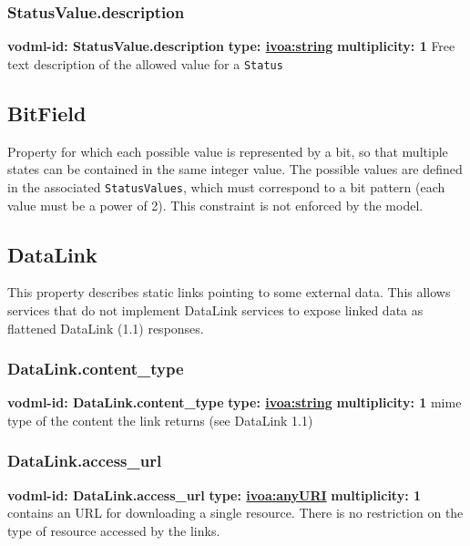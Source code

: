     \subsubsection{StatusValue.description}
    \textbf{vodml-id: StatusValue.description} \newline
    \textbf{type: \hyperref[sect:ivoa]{ivoa:string}} \newline
    \textbf{multiplicity: 1} \newline
    Free text description of the allowed value for a \texttt{Status}

  \subsection{BitField}
    \label{sect:BitField}
    Property for which each possible value is represented by a bit, so that multiple states can be contained in the same integer value. The possible values are defined in the associated \texttt{StatusValues}, which must correspond to a bit pattern (each value must be a power of 2). This constraint is not enforced by the model.

  \subsection{DataLink}
    \label{sect:DataLink}
    This property describes static links pointing to some external data. This allows services that do not implement DataLink services to expose linked data as flattened DataLink (1.1) responses.

    \subsubsection{DataLink.content\_type}
    \textbf{vodml-id: DataLink.content\_type} \newline
    \textbf{type: \hyperref[sect:ivoa]{ivoa:string}} \newline
    \textbf{multiplicity: 1} \newline
    mime type of the content the link returns (see DataLink 1.1)

    \subsubsection{DataLink.access\_url}
    \textbf{vodml-id: DataLink.access\_url} \newline
    \textbf{type: \hyperref[sect:ivoa]{ivoa:anyURI}} \newline
    \textbf{multiplicity: 1} \newline
    contains an URL for downloading a single resource. There is no restriction on the type of resource accessed by the links.

